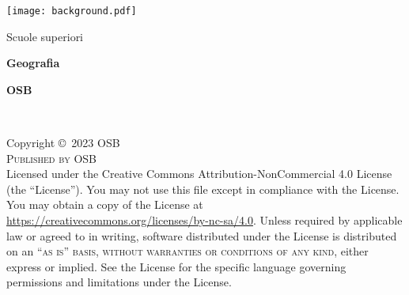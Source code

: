 \documentclass[
	11pt, %
	fleqn, %
	a4paper, %
]{LegrandOrangeBook}
\begin{document}

\titlepage %
	{\texttt{[image: background.pdf]}} %
	{ %
                \centering
		\vspace{16pt} %
		{\LARGE Scuole superiori\par} %
		\sffamily %
		{\Huge\bfseries Geografia\par} %
		\vspace{24pt} %
		{\huge\bfseries OSB\par} %
	}


\thispagestyle{empty} %

~\vfill %

\noindent Copyright \copyright\ 2023 OSB\\ %

\noindent \textsc{Published by OSB}\\ %


\noindent Licensed under the Creative Commons Attribution-NonCommercial 4.0 License (the ``License''). You may not use this file except in compliance with the License. You may obtain a copy of the License at \url{https://creativecommons.org/licenses/by-nc-sa/4.0}. Unless required by applicable law or agreed to in writing, software distributed under the License is distributed on an \textsc{``as is'' basis, without warranties or conditions of any kind}, either express or implied. See the License for the specific language governing permissions and limitations under the License.\\ %
\end{document}
